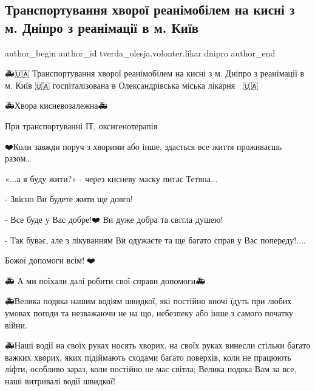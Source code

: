  
 
 
 
 

\subsection{Транспортування хворої реанімобілем на кисні з м. Дніпро з реанімації в м. Київ}
\label{sec:27_12_2022.fb.tverda_olesja.volonter.likar.dnipro.1._transportuvannya_kh}

\ifcmt
 author_begin
   author_id tverda_olesja.volonter.likar.dnipro
 author_end
\fi

🚑🇺🇦 Транспортування хворої реанімобілем на кисні з м. Дніпро з реанімації в
м. Київ 🇺🇦 госпіталізована в Олександрівська міська лікарня 🏥 🇺🇦

 🚑Хвора кисневозалежна🚑 

При транспортуванні ІТ, оксигенотерапія

❤️Коли завжди поруч з хворими або інше, здається все життя проживаєшь разом…

«...а я буду жити?» - через кисневу маску питає Тетяна...

- Звісно Ви будете жити ще довго!🌹

- Все буде у Вас добре!❤️ Ви дуже добра та світла душею!🙏

- Так буває, але з лікуванням Ви одужаєте та ще багато справ у Вас попереду!....

Божої допомоги всім!🙏❤️

🚑 А ми поїхали далі робити свої справи допомоги🚑

🚑Велика подяка нашим водіям швидкої, які постійно вночі їдуть при любих
умовах погоди та незважаючи не на що, небезпеку або інше з самого початку
війни. 

🚑Наші водії на своїх руках носять хворих, на своїх руках винесли стільки
багато важких хворих, яких підіймають сходами багато поверхів, коли не працюють
ліфти, особливо зараз, коли постійно не має світла; Велика подяка Вам за все,
наші витривалі водії швидкої!🙏

